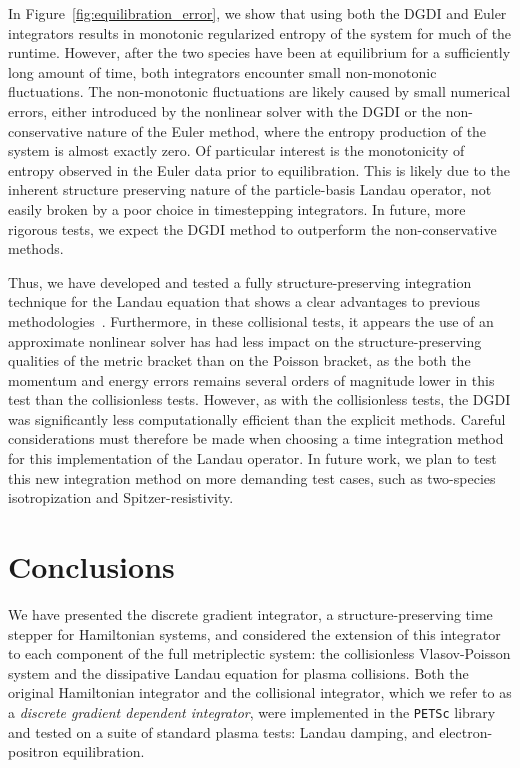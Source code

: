 \documentclass[preprint,12pt]{elsarticle}
\theoremstyle{definition}
\begin{document}
In Figure~\ref{fig:equilibration_error}, we show that using both the DGDI and Euler integrators results in monotonic regularized entropy of the system for much of the runtime. However, after the two species have been at equilibrium for a sufficiently long amount of time, both integrators encounter small non-monotonic fluctuations. The non-monotonic fluctuations are likely caused by small numerical errors, either introduced by the nonlinear solver with the DGDI or the non-conservative nature of the Euler method, where the entropy production of the system is almost exactly zero. Of particular interest is the monotonicity of entropy observed in the Euler data prior to equilibration. This is likely due to the inherent structure preserving nature of the particle-basis Landau operator, not easily broken by a poor choice in timestepping integrators. In future, more rigorous tests, we expect the DGDI method to outperform the non-conservative methods.

Thus, we have developed and tested a fully structure-preserving integration technique for the Landau equation that shows a clear advantages to previous methodologies~\cite{Carrillo2020}. Furthermore, in these collisional tests, it appears the use of an approximate nonlinear solver has had less impact on the structure-preserving qualities of the metric bracket than on the Poisson bracket, as the both the momentum and energy errors remains several orders of magnitude lower in this test than the collisionless tests. However, as with the collisionless tests, the DGDI was significantly less computationally efficient than the explicit methods. Careful considerations must therefore be made when choosing a time integration method for this implementation of the Landau operator. In future work, we plan to test this new integration method on more demanding test cases, such as two-species isotropization and Spitzer-resistivity.

\section{\label{sec:Conclusions}Conclusions}

We have presented the discrete gradient integrator, a structure-preserving time stepper for Hamiltonian systems, and considered the extension of this integrator to each component of the full metriplectic system: the collisionless Vlasov-Poisson system and the dissipative Landau equation for plasma collisions. Both the original Hamiltonian integrator and the collisional integrator, which we refer to as a \textit{discrete gradient dependent integrator}, were implemented in the \texttt{PETSc} library and tested on a suite of standard plasma tests: Landau damping, and electron-positron equilibration.
\end{document}
